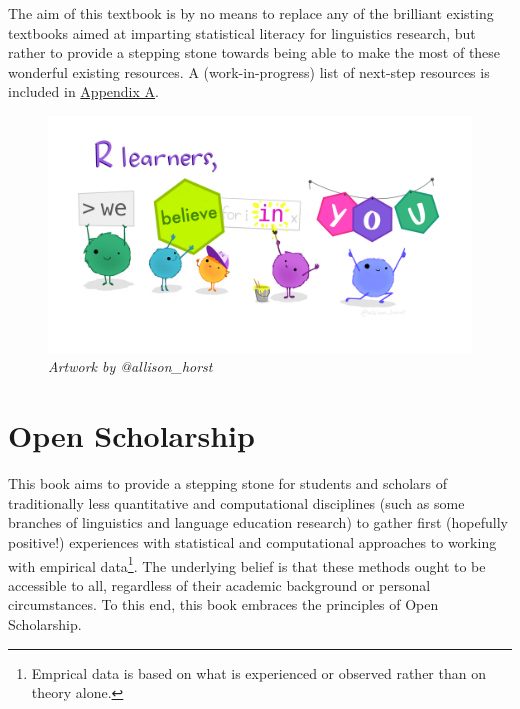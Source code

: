 \documentclass[
  letterpaper,
  DIV=11,
  numbers=noendperiod]{scrreprt}
\begin{document}
The aim of this textbook is by no means to replace any of the brilliant
existing textbooks aimed at imparting statistical literacy for
linguistics research, but rather to provide a stepping stone towards
being able to make the most of these wonderful existing resources. A
(work-in-progress) list of next-step resources is included in
\href{https://elenlefoll.github.io/RstatsTextbook/FurtherResources.html}{Appendix
A}.

\begin{figure}[H]

{\centering \includegraphics{images/RLearnersWeBelieve.png}

}

\caption{\emph{Artwork by @allison\_horst}}

\end{figure}%


\chapter{Open Scholarship}\label{open-scholarship}

This book aims to provide a stepping stone for students and scholars of
traditionally less quantitative and computational disciplines (such as
some branches of linguistics and language education research) to gather
first (hopefully positive!) experiences with statistical and
computational approaches to working with empirical data\footnote{Emprical
  data is based on what is experienced or observed rather than on theory
  alone.}. The underlying belief is that these methods ought to be
accessible to all, regardless of their academic background or personal
circumstances. To this end, this book embraces the principles of Open
Scholarship.
\end{document}
